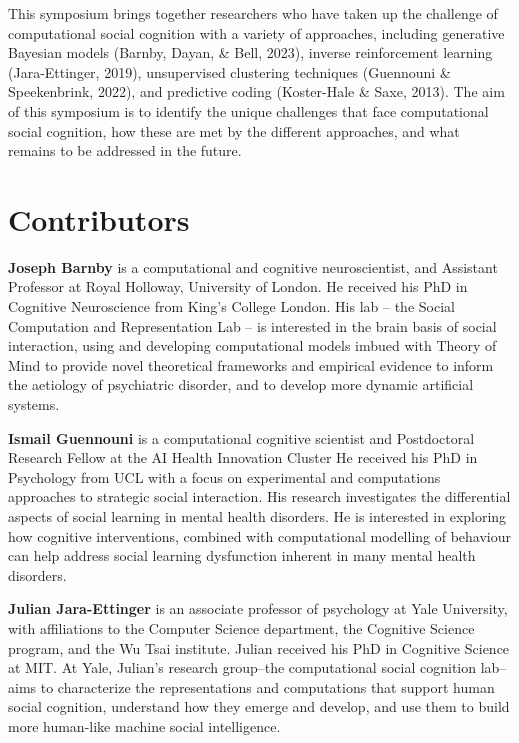 \documentclass[10pt, letterpaper]{article}
\begin{document}
This symposium brings together researchers who have taken up the
challenge of computational social cognition with a variety of
approaches, including generative Bayesian models (Barnby, Dayan, \&
Bell, 2023), inverse reinforcement learning (Jara-Ettinger, 2019),
unsupervised clustering techniques (Guennouni \& Speekenbrink, 2022),
and predictive coding (Koster-Hale \& Saxe, 2013). The aim of this
symposium is to identify the unique challenges that face computational
social cognition, how these are met by the different approaches, and
what remains to be addressed in the future.

\hypertarget{contributors}{%
\section{Contributors}\label{contributors}}

\textbf{Joseph Barnby} is a computational and cognitive neuroscientist,
and Assistant Professor at Royal Holloway, University of London. He
received his PhD in Cognitive Neuroscience from King's College London.
His lab -- the Social Computation and Representation Lab -- is
interested in the brain basis of social interaction, using and
developing computational models imbued with Theory of Mind to provide
novel theoretical frameworks and empirical evidence to inform the
aetiology of psychiatric disorder, and to develop more dynamic
artificial systems.

\textbf{Ismail Guennouni} is a computational cognitive scientist and
Postdoctoral Research Fellow at the AI Health Innovation Cluster He
received his PhD in Psychology from UCL with a focus on experimental and
computations approaches to strategic social interaction. His research
investigates the differential aspects of social learning in mental
health disorders. He is interested in exploring how cognitive
interventions, combined with computational modelling of behaviour can
help address social learning dysfunction inherent in many mental health
disorders.

\textbf{Julian Jara-Ettinger} is an associate professor of psychology at
Yale University, with affiliations to the Computer Science department,
the Cognitive Science program, and the Wu Tsai institute. Julian
received his PhD in Cognitive Science at MIT. At Yale, Julian's research
group--the computational social cognition lab--aims to characterize the
representations and computations that support human social cognition,
understand how they emerge and develop, and use them to build more
human-like machine social intelligence.
\end{document}
